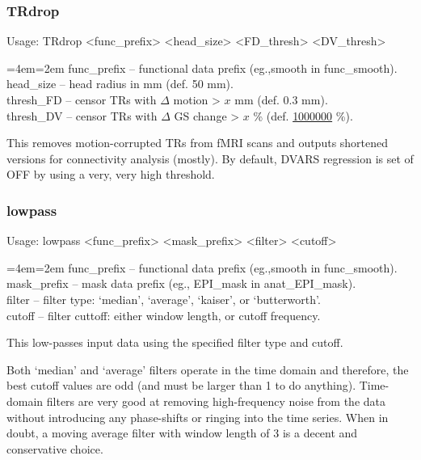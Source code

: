 \documentclass[final,titlepage,letterpaper,oneside,12pt]{article}
\renewcommand{\texttt}[2][BrickRed]{\textcolor{#1}{\ttfamily #2}}%
\newenvironment{blockquote}{%
  \par%
  \medskip
  \leftskip=4em\rightskip=2em%
  \noindent\ignorespaces}{%
  \par\medskip}
\begin{document}
\subsubsection{TRdrop}
Usage: \texttt{TRdrop <func\_prefix> <head\_size> <FD\_thresh> <DV\_thresh>}

\begin{blockquote}
func\_prefix -- functional data prefix (eg.,smooth in func\_smooth). \\
head\_size -- head radius in mm (def. 50 mm). \\
thresh\_FD -- censor TRs with $\Delta$ motion > $x$ mm (def. 0.3 mm). \\
thresh\_DV -- censor TRs with $\Delta$ GS change > $x$ \% (def. \href{http://upload.wikimedia.org/wikipedia/en/1/16/Drevil_million_dollars.jpg}{1000000} \%). \
\end{blockquote}

\noindent This removes motion-corrupted TRs from fMRI scans and outputs shortened versions for connectivity analysis (mostly). By default, DVARS regression is set of OFF by using a very, very high threshold.

\subsubsection{lowpass}
Usage: \texttt{lowpass <func\_prefix> <mask\_prefix> <filter> <cutoff>}

\begin{blockquote}
func\_prefix -- functional data prefix (eg.,smooth in func\_smooth). \\
mask\_prefix -- mask data prefix (eg., EPI\_mask in anat\_EPI\_mask). \\
filter -- filter type: `median', `average', `kaiser', or `butterworth'. \\
cutoff -- filter cuttoff: either window length, or cutoff frequency. \
\end{blockquote}

\noindent This low-passes input data using the specified filter type and cutoff. 

Both `median' and `average' filters operate in the time domain and therefore, the best cutoff values are odd (and must be larger than 1 to do anything). Time-domain filters are very good at removing high-frequency noise from the data without introducing any phase-shifts or ringing into the time series. When in doubt, a moving average filter with window length of 3 is a decent and conservative choice.
\end{document}
